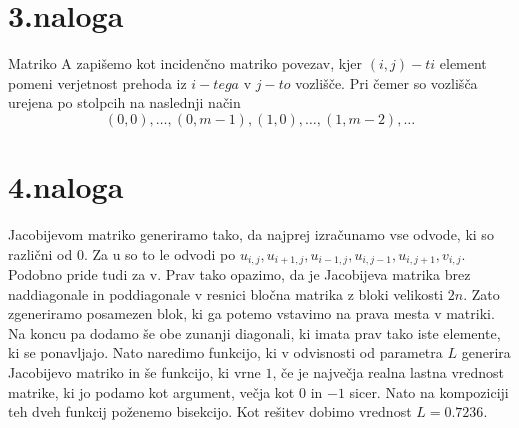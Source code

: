 \documentclass[11pt]{article} %
\begin{document}
\section{3.naloga}
Matriko A zapišemo kot incidenčno matriko povezav, kjer $(i,j)-ti$ element pomeni verjetnost prehoda iz $i-tega$ v $j-to$ vozlišče. Pri čemer so vozlišča urejena po stolpcih na naslednji način
$$(0,0),\ldots, (0,m-1), (1,0), \ldots, (1,m-2), \ldots$$

\section{4.naloga}

Jacobijevom matriko generiramo tako, da najprej izračunamo vse odvode, ki so različni od $0$. Za u so to le odvodi po $u_{i,j},u_{i+1,j},u_{i-1,j},u_{i,j-1},u_{i,j+1},v_{i,j}$. Podobno pride tudi za v. Prav tako opazimo, da je Jacobijeva matrika brez naddiagonale in poddiagonale v resnici bločna matrika z bloki velikosti $2n$. Zato zgeneriramo posamezen blok, ki ga potemo vstavimo na prava mesta v matriki. Na koncu pa dodamo še obe zunanji diagonali, ki imata prav tako iste elemente, ki se ponavljajo. Nato naredimo funkcijo, ki v odvisnosti od parametra $L$ generira Jacobijevo matriko in še funkcijo, ki vrne $1$, če je največja realna lastna vrednost matrike, ki jo podamo kot argument, večja kot $0$ in $-1$ sicer. Nato na kompoziciji teh dveh funkcij poženemo bisekcijo. Kot rešitev dobimo vrednost $L=0.7236$.  
\end{document}
